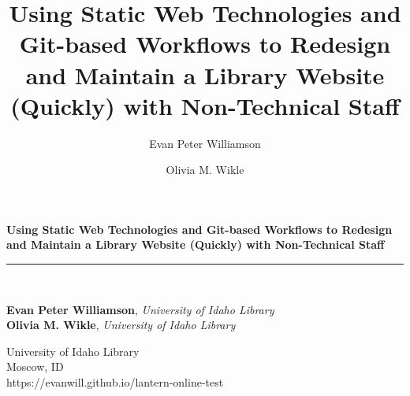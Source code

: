 \documentclass{book}
\title{Using Static Web Technologies and Git-based Workflows to Redesign and
Maintain a Library Website (Quickly) with Non-Technical Staff}
\author{Evan Peter Williamson \and Olivia M. Wikle}
\begin{document}
\frontmatter

\begin{titlepage}
\begin{flushleft}

\textbf{\fontsize{48}{54}\selectfont Using Static Web Technologies and
Git-based Workflows to Redesign and Maintain a Library Website (Quickly) with
Non-Technical Staff \\}
\textbf{\large \textit{}}

\par\noindent\rule{\textwidth}{4pt}\\

\begin{flushright}

      \textbf{Evan Peter Williamson}, \emph{University of Idaho Library}\\
      \textbf{Olivia M. Wikle}, \emph{University of Idaho Library}\\
  
\end{flushright}

\vspace{\fill}

\end{flushleft}

\begin{center}
  \small{University of Idaho Library\\
  Moscow, ID\\
  https://evanwill.github.io/lantern-online-test}
\end{center}
  
\end{titlepage}
\restoregeometry

\thispagestyle{empty}
\end{document}
